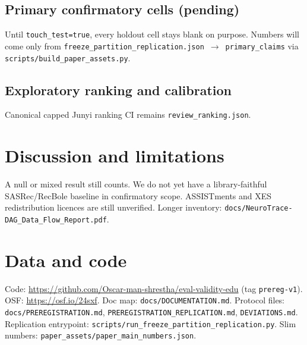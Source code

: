 \documentclass[11pt,a4paper]{article}
\begin{document}
\subsection{Primary confirmatory cells (pending)}
Until \texttt{touch\_test=true}, every holdout cell stays blank on purpose.
Numbers will come only from
\texttt{freeze\_partition\_replication.json}~$\to$~\texttt{primary\_claims}
via \texttt{scripts/build\_paper\_assets.py}.

\begin{table}[t]
\centering
\caption{Confirmatory unit cells (Bonferroni). Validation dual-map numbers
from before registration are disclosure only.}

\end{table}

\begin{table}[t]
\centering
\caption{Dataset-level primary claims (sign flip).}

\end{table}

\begin{table}[t]
\centering
\caption{Scope: confirmatory vs exploratory.}

\end{table}

\subsection{Exploratory ranking and calibration}
Canonical capped Junyi ranking CI remains \texttt{review\_ranking.json}.

\begin{table}[t]
\centering
\caption{Capped vs full-test ranking (exploratory).}

\end{table}

\begin{table}[t]
\centering
\caption{Calibration (exploratory).}

\end{table}

\section{Discussion and limitations}
A null or mixed result still counts. We do not yet have a library-faithful
SASRec/RecBole baseline in confirmatory scope. ASSISTments and XES
redistribution licences are still unverified. Longer inventory:
\texttt{docs/NeuroTrace-DAG\_Data\_Flow\_Report.pdf}.

\section{Data and code}
Code: \url{https://github.com/Oscar-man-shrestha/eval-validity-edu}
(tag \texttt{prereg-v1}).
OSF: \url{https://osf.io/24sxf}.
Doc map: \texttt{docs/DOCUMENTATION.md}.
Protocol files: \texttt{docs/PREREGISTRATION.md},
\texttt{PREREGISTRATION\_REPLICATION.md}, \texttt{DEVIATIONS.md}.
Replication entrypoint:
\texttt{scripts/run\_freeze\_partition\_replication.py}.
Slim numbers: \texttt{paper\_assets/paper\_main\_numbers.json}.
\end{document}
